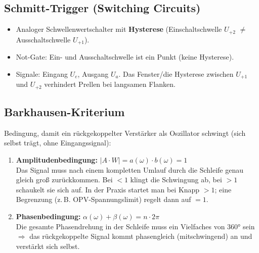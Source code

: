 \documentclass[11pt,a4paper]{article}
\begin{document}
\subsection{Schmitt-Trigger (Switching Circuits)}
\begin{itemize}
    \item Analoger Schwellenwertschalter mit \textbf{Hysterese} (Einschaltschwelle $U_{+2}$ $\neq$ Ausschaltschwelle $U_{+1}$).
    \item Not-Gate: Ein- und Ausschaltschwelle ist ein Punkt (keine Hysterese).
    \item Signale: Eingang $U_e$, Ausgang $U_a$. Das Fenster/die Hysterese zwischen $U_{+1}$ und $U_{+2}$ verhindert Prellen bei langsamen Flanken.
\end{itemize}

\subsection{Barkhausen-Kriterium}
Bedingung, damit ein rückgekoppelter Verstärker als Oszillator schwingt (sich selbst trägt, ohne Eingangssignal):

\begin{enumerate}
    \item \textbf{Amplitudenbedingung:} $|A \cdot W| = a(\omega) \cdot b(\omega) = 1$\\
        Das Signal muss nach einem kompletten Umlauf durch die Schleife genau gleich groß zurückkommen. Bei $<1$ klingt die Schwingung ab, bei $>1$ schaukelt sie sich auf. In der Praxis startet man bei Knapp $>1$; eine Begrenzung (z.\,B. OPV-Spannungslimit) regelt dann auf $=1$.
    \item \textbf{Phasenbedingung:} $\alpha(\omega) + \beta(\omega) = n \cdot 2\pi$\\
        Die gesamte Phasendrehung in der Schleife muss ein Vielfaches von $360°$ sein $\Rightarrow$ das rückgekoppelte Signal kommt phasengleich (mitschwingend) an und verstärkt sich selbst.
\end{enumerate}
\end{document}
